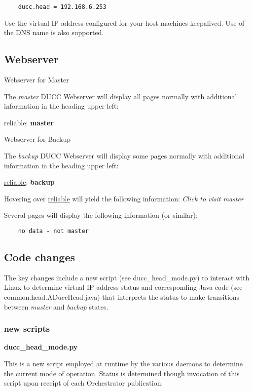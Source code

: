 \documentclass[letterpaper]{article}
\begin{document}
    \begin{verbatim}
	ducc.head = 192.168.6.253
   	\end{verbatim}
    
    Use the virtual IP address configured for your host machines keepalived. 
    Use of the DNS name is also supported.  
    
\subsection{Webserver}

	Webserver for Master

	The {\em master} DUCC Webserver will display all pages normally with additional
	information in the heading upper left:
	
	reliable: \textbf{master}
	
	Webserver for Backup
	
	The {\em backup} DUCC Webserver will display some pages normally with additional
	information in the heading upper left:
	
	\underline{reliable}: \textbf{backup}
   	
   	Hovering over \underline{reliable} will yield the following information:
   	{\em Click to visit master}
   	
   	Several pages will display the following information (or similar):
   	
   	\begin{verbatim}
	no data - not master
   	\end{verbatim}
	
\subsection{Code changes}

The key changes include a new script (see ducc\_head\_mode.py) to 
interact with Linux to determine virtual IP address status and 
corresponding Java code (see common.head.ADuccHead.java)
that interprets the status to make transitions between 
{\em master} and {\em backup} states.

\subsubsection{new scripts}

\textbf{ducc\_head\_mode.py}

This is a new script employed at runtime by the various daemons to
determine the current mode of operation.  Status is determined 
though invocation of this script upon receipt of each Orchestrator
publication.
\end{document}

